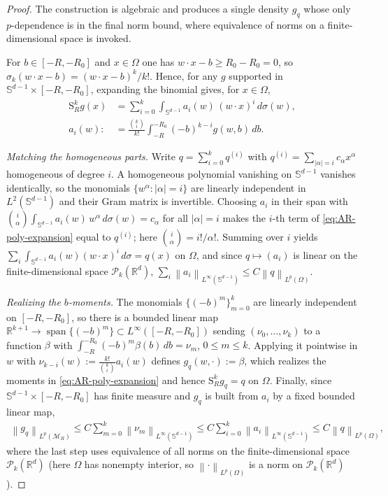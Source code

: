 \documentclass[12pt]{article}
\numberwithin{equation}{section}
\numberwithin{figure}{section}
\numberwithin{equation}{section}
\newcommand{\R}{\mathbb{R}}
\newcommand{\Sph}{\mathbb S}
\newcommand{\MR}{\mathcal M_R}
\newcommand{\norm}[1]{\left\|#1\right\|}
\newcommand{\abs}[1]{\left|#1\right|}
\begin{document}
\begin{proof}
The construction is algebraic and produces a single density $g_q$ whose only
$p$-dependence is in the final norm bound, where equivalence of norms on a
finite-dimensional space is invoked.

For $b\in[-R,-R_0]$ and $x\in\Omega$ one has $w\cdot x-b\ge R_0-R_0=0$, so
$\sigma_k(w\cdot x-b)=(w\cdot x-b)^k/k!$. Hence, for any $g$ supported in
$\Sph^{d-1}\times[-R,-R_0]$, expanding the binomial gives, for $x\in\Omega$,
\begin{align}
    \mathrm{S}^k_R g(x)
    &=\sum_{i=0}^k\int_{\Sph^{d-1}}a_i(w)\,(w\cdot x)^i\,d\sigma(w),
    \\
    a_i(w):&=\frac{\binom{k}{i}}{k!}\int_{-R}^{-R_0}(-b)^{k-i}g(w,b)\,db.
    \label{eq:AR-poly-expansion}
\end{align}

\emph{Matching the homogeneous parts.} Write $q=\sum_{i=0}^k q^{(i)}$ with
$q^{(i)}=\sum_{\abs\alpha=i}c_\alpha x^\alpha$ homogeneous of degree $i$. A
homogeneous polynomial vanishing on $\Sph^{d-1}$ vanishes identically, so the
monomials $\{w^\alpha:\abs\alpha=i\}$ are linearly independent in
$L^2(\Sph^{d-1})$ and their Gram matrix is invertible. Choosing $a_i$ in their
span with
$\binom{i}{\alpha}\int_{\Sph^{d-1}}a_i(w)\,w^\alpha\,d\sigma(w)=c_\alpha$ for all
$\abs\alpha=i$ makes the $i$-th term of \eqref{eq:AR-poly-expansion} equal to
$q^{(i)}$; here $\binom{i}{\alpha}=i!/\alpha!$. Summing over $i$ yields
$\sum_i\int_{\Sph^{d-1}}a_i(w)(w\cdot x)^i\,d\sigma=q(x)$ on $\Omega$, and since
$q\mapsto(a_i)$ is linear on the finite-dimensional space $\mathcal P_k(\R^d)$,
$\sum_i\norm{a_i}_{L^\infty(\Sph^{d-1})}\le C\norm{q}_{L^p(\Omega)}$.

\emph{Realizing the $b$-moments.} The monomials $\{(-b)^m\}_{m=0}^k$ are linearly
independent on $[-R,-R_0]$, so there is a bounded linear map
$\R^{k+1}\to\operatorname{span}\{(-b)^m\}\subset L^\infty([-R,-R_0])$ sending
$(\nu_0,\dots,\nu_k)$ to a function $\beta$ with
$\int_{-R}^{-R_0}(-b)^m\beta(b)\,db=\nu_m$, $0\le m\le k$. Applying it pointwise
in $w$ with $\nu_{k-i}(w):=\tfrac{k!}{\binom{k}{i}}a_i(w)$ defines
$g_q(w,\cdot):=\beta$, which realizes the moments in \eqref{eq:AR-poly-expansion}
and hence $\mathrm{S}^k_R g_q=q$ on $\Omega$. Finally, since
$\Sph^{d-1}\times[-R,-R_0]$ has finite measure and $g_q$ is built from $a_i$ by a
fixed bounded linear map,
\begin{align*}
    \norm{g_q}_{L^p(\MR)}
    \le C\sum_{m=0}^k\norm{\nu_m}_{L^\infty(\Sph^{d-1})}
    \le C\sum_{i=0}^k\norm{a_i}_{L^\infty(\Sph^{d-1})}
    \le C\norm{q}_{L^p(\Omega)} ,
\end{align*}
where the last step uses equivalence of all norms on the finite-dimensional space
$\mathcal P_k(\R^d)$ (here $\Omega$ has nonempty interior, so $\norm{\cdot}_{L^p(\Omega)}$
is a norm on $\mathcal P_k(\R^d)$).
\end{proof}
\end{document}
